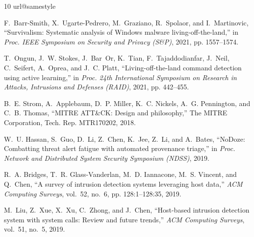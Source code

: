 \documentclass[conference]{IEEEtran}
\begin{document}
\begin{thebibliography}{10}
\providecommand{\url}[1]{#1}
\csname url@samestyle\endcsname
\providecommand{\newblock}{\relax}
\providecommand{\bibinfo}[2]{#2}
\providecommand{\BIBentrySTDinterwordspacing}{\spaceskip=0pt\relax}
\providecommand{\BIBentryALTinterwordstretchfactor}{4}
\providecommand{\BIBentryALTinterwordspacing}{\spaceskip=\fontdimen2\font plus
\BIBentryALTinterwordstretchfactor\fontdimen3\font minus
  \fontdimen4\font\relax}
\providecommand{\BIBforeignlanguage}[2]{{%
\expandafter\ifx\csname l@#1\endcsname\relax
\typeout{** WARNING: IEEEtran.bst: No hyphenation pattern has been}%
\typeout{** loaded for the language `#1'. Using the pattern for}%
\typeout{** the default language instead.}%
\else
\language=\csname l@#1\endcsname
\fi
#2}}
\providecommand{\BIBdecl}{\relax}
\BIBdecl

F.~Barr-Smith, X.~Ugarte-Pedrero, M.~Graziano, R.~Spolaor, and I.~Martinovic,
  ``Survivalism: Systematic analysis of {Windows} malware
  living-off-the-land,'' in \emph{Proc. IEEE Symposium on Security and Privacy
  (S\&P)}, 2021, pp. 1557--1574.

T.~Ongun, J.~W. Stokes, J.~Bar~Or, K.~Tian, F.~Tajaddodianfar, J.~Neil,
  C.~Seifert, A.~Oprea, and J.~C. Platt, ``Living-off-the-land command
  detection using active learning,'' in \emph{Proc. 24th International
  Symposium on Research in Attacks, Intrusions and Defenses (RAID)}, 2021, pp.
  442--455.

B.~E. Strom, A.~Applebaum, D.~P. Miller, K.~C. Nickels, A.~G. Pennington, and
  C.~B. Thomas, ``{MITRE ATT\&CK}: Design and philosophy,'' The MITRE
  Corporation, Tech. Rep. MTR170202, 2018.

W.~U. Hassan, S.~Guo, D.~Li, Z.~Chen, K.~Jee, Z.~Li, and A.~Bates, ``{NoDoze}:
  Combatting threat alert fatigue with automated provenance triage,'' in
  \emph{Proc. Network and Distributed System Security Symposium (NDSS)}, 2019.

R.~A. Bridges, T.~R. Glass-Vanderlan, M.~D. Iannacone, M.~S. Vincent, and
  Q.~Chen, ``A survey of intrusion detection systems leveraging host data,''
  \emph{ACM Computing Surveys}, vol.~52, no.~6, pp. 128:1--128:35, 2019.

M.~Liu, Z.~Xue, X.~Xu, C.~Zhong, and J.~Chen, ``Host-based intrusion detection
  system with system calls: Review and future trends,'' \emph{ACM Computing
  Surveys}, vol.~51, no.~5, 2019.


\end{thebibliography}
\end{document}
